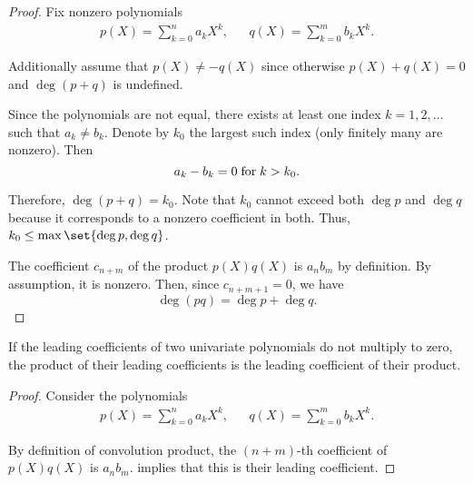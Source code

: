 \begin{proof}
  Fix nonzero polynomials
  \begin{align*}
    p(X) = \sum_{k=0}^n a_k X^k, &&
    q(X) = \sum_{k=0}^m b_k X^k.
  \end{align*}

   Additionally assume that \( p(X) \neq -q(X) \) since otherwise \( p(X) + q(X) = 0 \) and \( \deg(p + q) \) is undefined.

  Since the polynomials are not equal, there exists at least one index \( k = 1, 2, \ldots \) such that \( a_k \neq b_k \). Denote by \( k_0 \) the largest such index (only finitely many are nonzero). Then
  \begin{equation*}
    a_k - b_k = 0 \T{for} k > k_0.
  \end{equation*}

  Therefore, \( \deg(p + q) = k_0 \). Note that \( k_0 \) cannot exceed both \( \deg p \) and \( \deg q \) because it corresponds to a nonzero coefficient in both. Thus, \( k_0 \leq \max\set{ \deg p, \deg q } \).

   The coefficient \( c_{n + m} \) of the product \( p(X) q(X) \) is \( a_n b_m \) by definition. By assumption, it is nonzero. Then, since \( c_{n+m+1} = 0 \), we have
  \begin{equation*}
    \deg (pq) = \deg p + \deg q.
  \end{equation*}
\end{proof}

\begin{corollary}\label{thm:leading_coefficient_of_product}
  If the leading coefficients of two univariate polynomials do not multiply to zero, the product of their leading coefficients is the leading coefficient of their product.
\end{corollary}
\begin{proof}
  Consider the polynomials
  \begin{align*}
    p(X) = \sum_{k=0}^n a_k X^k, &&
    q(X) = \sum_{k=0}^m b_k X^k.
  \end{align*}

  By definition of convolution product, the \( (n + m) \)-th coefficient of \( p(X) q(X) \) is \( a_n b_m \).  implies that this is their leading coefficient.
\end{proof}

